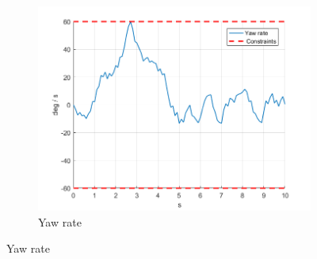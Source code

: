 \documentclass[11pt]{article}
\begin{document}
\begin{enumerate}
\begin{figure}[ht]
\begin{subfigure}[c]{0.3\linewidth}
            \includegraphics[width=\linewidth]{Plots_14_SlewRateConstraints/06}
            \caption{Yaw rate}
        \end{subfigure}


\end{figure}
\end{enumerate}
\end{document}
